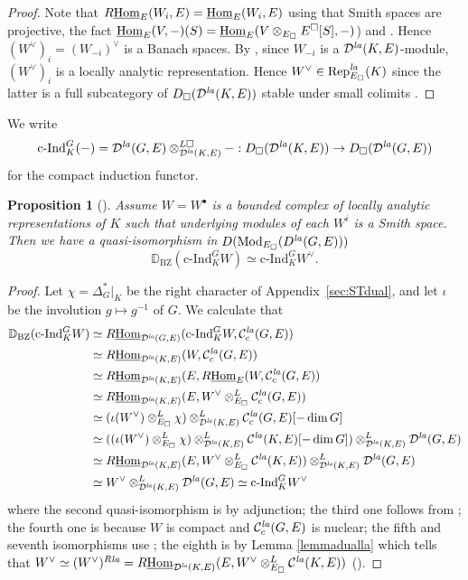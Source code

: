 \documentclass[a4paper,10pt]{amsart}
\theoremstyle{remark}
\theoremstyle{definition}
\theoremstyle{plain}
\newtheorem{proposition}[theorem]{Proposition}
\numberwithin{equation}{section}
\newcommand{\bbD}{{\mathbb D}}
\newcommand{\calC}{{\mathcal C}}
\newcommand{\calD}{{\mathcal D}}
\newcommand{\Hom}{{\rm Hom}}
\newcommand{\uHom}{\underline{\Hom}}
\newcommand{\la}{{\it la}}
\newcommand{\Mod}{{\rm Mod}}
\newcommand{\Rep}{{\rm Rep}}
\newcommand{\cInd}{\mathrm{c\text{-}Ind}}
\newcommand{\BZ}{\ensuremath{\mathrm{BZ}}}
\begin{document}
\begin{proof}
	Note that $R\underline{\Hom}_E(W_i,E)=\underline{\Hom}_E(W_i,E)$ using that Smith spaces are projective, the fact $\uHom_E(V,-)(S)=\uHom_E(V\otimes_{E_{\square}}E^{\square}[S],-)$) and \cite[Prop.~3.12]{rodrigues2022solid}. Hence $(W^\vee)_i=(W_{-i})^{\vee}$ is a Banach spaces. By \cite[Prop.~4.41, Thm.~4.36(2)]{rodrigues2022solid}, since $W_{-i}$ is a $\calD^{\la}(K,E)$-module, $(W^\vee)_i$ is a locally analytic representation. Hence $W^{\vee}\in \Rep^{\la}_{E_\square}(K)$ since the latter is a full subcategory of $D_{\square}(\calD^{\la}(K,E))$ stable under small colimits \cite[Prop.~3.3.3]{JC23}.
\end{proof}
We write 
\[\cInd_{K}^{G}(-)=\calD^{\la}(G,E)\otimes^{L\square}_{\calD^{\la}(K,E)}-:D_{\square}(\calD^{\la}(K,E))\rightarrow D_{\square}(\calD^{\la}(G,E))\] 
for the compact induction functor.
\begin{proposition}[{\cite[Thm.~5.3]{strauch2025bernsteinzelevinskydualitylocallyanalytic}}]\label{BZdual}
	Assume $W=W^{\bullet}$ is a bounded complex of locally analytic representations of $K$ such that underlying modules of each $W^i$ is a Smith space. Then we have a quasi-isomorphism in $D(\Mod_{E_\square}(D^{\la}(G,E)))$
	$$\bbD_{\BZ}(\cInd_K^G W)\simeq \cInd_K^G W^\vee.$$
\end{proposition}
\begin{proof} 
	Let $\chi=\Delta_G^*|_K$ be the right character of Appendix~\ref{sec:STdual}, and let $\iota$ be the involution $g\mapsto g^{-1}$ of $G$. We calculate that
	$$\begin{aligned}
	\bbD_{\BZ}(\cInd_K^G W)
	&\simeq R\underline{\Hom}_{\calD^{\la}(G,E)}(\cInd_K^G W,\calC_c^{\la}(G,E))\\
	&\simeq R\underline{\Hom}_{\calD^{\la}(K,E)}(W,\calC_c^{\la}(G,E))\\
	&\simeq R\underline{\Hom}_{\calD^{\la}(K,E)}(E,R\underline{\Hom}_E(W,\calC_c^{\la}(G,E))\\
	&\simeq R\underline{\Hom}_{\calD^{\la}(K,E)}(E,W^\vee\otimes^L_{E_\square} \calC_c^{\la}(G,E))\\
	&\simeq (\iota(W^{\vee})\otimes^L_{E_\square} \chi)\otimes_{\calD^{\la}(K,E)}^L \calC_c^{\la}(G,E)[-\dim G]\\
	&\simeq  ((\iota(W^{\vee})\otimes^L_{E_\square} \chi)\otimes^L_{\calD^{\la}(K,E)} \calC^{\la}(K,E)[-\dim G])\otimes^L_{\calD^{\la}(K,E)} \calD^{\la}(G,E)\\
	&\simeq  R\uHom_{\calD^{\la}(K,E)}(E, W^{\vee}\otimes^L_{E_\square} \calC^{\la}(K,E))\otimes^L_{\calD^{\la}(K,E)} \calD^{\la}(G,E)\\
	&\simeq W^\vee \otimes^L_{\calD^{\la}(K,E)}\calD^{\la}(G,E) \simeq \cInd_K^G W^\vee
\end{aligned}$$
where the second quasi-isomorphism is by adjunction; the third one follows from \cite[Prop.~A.2.1(4)]{JC23}; the fourth one is because $W$ is compact and $\calC_c^{\la}(G,E)$ is nuclear; the fifth and seventh isomorphisms use \cite[Prop.~3.2.12]{JC23}; the eighth is by Lemma \ref{lemmadualla} which tells that $W^\vee\simeq (W^\vee)^{R\la}=R\uHom_{\calD^{\la}(K,E)}(E, W^{\vee}\otimes^L_{E_\square} \calC^{\la}(K,E))$ (\cite[Def.~3.2.2]{JC23}).
\end{proof}
\end{document}
